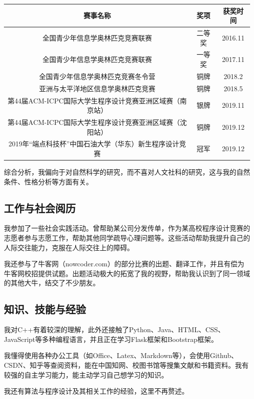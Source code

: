 \documentclass{article}
\begin{document}
\begin{tabular}{|c|c|c|}
    \hline
    赛事名称 & 奖项 & 获奖时间 \\
    \hline
    全国青少年信息学奥林匹克竞赛联赛 & 二等奖 & 2016.11 \\
    \hline
    全国青少年信息学奥林匹克竞赛联赛 & 一等奖 & 2017.11 \\
    \hline
    全国青少年信息学奥林匹克竞赛冬令营 & 铜牌 & 2018.2 \\
    \hline
    亚洲与太平洋地区信息学奥林匹克竞赛 & 铜牌 & 2018.5 \\
    \hline
    第44届ACM-ICPC国际大学生程序设计竞赛亚洲区域赛（南京站） & 银牌 & 2019.11 \\
    \hline
    第44届ACM-ICPC国际大学生程序设计竞赛亚洲区域赛（沈阳站） & 铜牌 & 2019.12 \\
    \hline
    2019年“端点科技杯”中国石油大学（华东）新生程序设计竞赛 & 冠军 & 2019.12 \\
    \hline
\end{tabular}

综合分析，我偏向于对自然科学的研究，而不喜对人文社科的研究，这与我的自然条件、性格分析等方面有关。

\subsection{工作与社会阅历}

我参加了一些社会实践活动。曾帮助某公司分发传单，作为某高校程序设计竞赛的志愿者参与志愿工作，帮助其他同学疏导心理问题等。这些活动帮助我提升自己的人际交往能力，克服在人际交往上的障碍。

我还参与了牛客网（nowcoder.com）的部分比赛的出题、翻译工作，并且有偿为牛客网校招提供试题。出题活动极大的拓宽了我的视野，帮助我认识到了同一领域的其他大牛，结交了不少朋友。

\subsection{知识、技能与经验}

我对C++有着较深的理解，此外还接触了Python、Java、HTML、CSS、JavaScript等多种编程语言，并且正在学习Flask框架和Bootstrap框架。

我懂得使用各种办公工具（如Office、Latex、Markdown等），会使用Github、CSDN、知乎等查阅资料，能在中国知网、校图书馆等搜集文献和书籍资料。我有较强的自主学习能力，能主动学习自己想学习的知识。

我还有算法与程序设计及其相关工作的经验，这里不再赘述。
\end{document}

